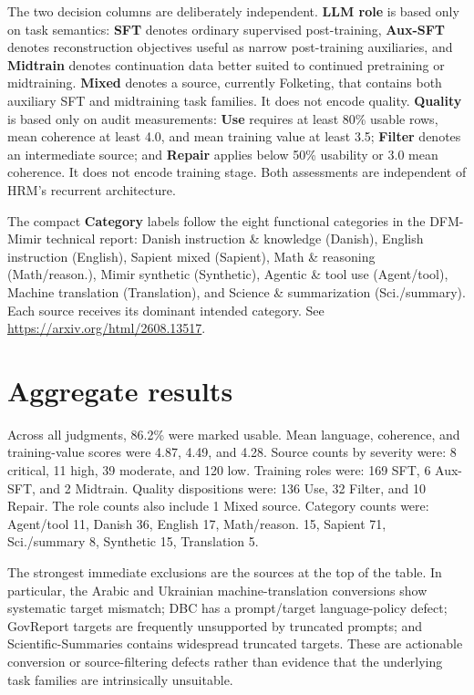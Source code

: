 \documentclass[10pt,a4paper]{article}
\begin{document}
The two decision columns are deliberately independent. \textbf{LLM role} is
based only on task semantics: \textbf{SFT} denotes ordinary supervised
post-training, \textbf{Aux-SFT} denotes reconstruction objectives useful as
narrow post-training auxiliaries, and \textbf{Midtrain} denotes continuation
data better suited to continued pretraining or midtraining. \textbf{Mixed}
denotes a source, currently Folketing, that contains both auxiliary SFT and
midtraining task families. It does not encode quality. \textbf{Quality} is
based only on audit measurements:
\textbf{Use} requires at least 80\% usable rows, mean coherence at least 4.0,
and mean training value at least 3.5; \textbf{Filter} denotes an intermediate
source; and \textbf{Repair} applies below 50\% usability or 3.0 mean
coherence. It does not encode training stage. Both assessments are independent
of HRM's recurrent architecture.

The compact
\textbf{Category} labels follow the eight functional categories in the
DFM-Mimir technical report: Danish instruction \& knowledge (Danish), English
instruction (English), Sapient mixed (Sapient), Math \& reasoning
(Math/reason.), Mimir synthetic (Synthetic), Agentic \& tool use (Agent/tool),
Machine translation (Translation), and Science \& summarization
(Sci./summary). Each source receives its dominant intended category. See
\url{https://arxiv.org/html/2608.13517}.

\section*{Aggregate results}
Across all judgments, 86.2\% were marked usable. Mean language,
coherence, and training-value scores were 4.87,
4.49, and 4.28. Source counts
by severity were: 8 critical, 11 high,
39 moderate, and 120 low. Training roles were:
169 SFT, 6 Aux-SFT, and 2 Midtrain.
Quality dispositions were: 136 Use,
32 Filter, and 10 Repair.
The role counts also include 1 Mixed source.
Category counts were: Agent/tool 11, Danish 36, English 17, Math/reason. 15, Sapient 71, Sci./summary 8, Synthetic 15, Translation 5.

The strongest immediate exclusions are the sources at the top of the table.
In particular, the Arabic and Ukrainian machine-translation conversions show
systematic target mismatch; DBC has a prompt/target language-policy defect;
GovReport targets are frequently unsupported by truncated prompts; and
Scientific-Summaries contains widespread truncated targets. These are actionable
conversion or source-filtering defects rather than evidence that the underlying
task families are intrinsically unsuitable.
\end{document}
